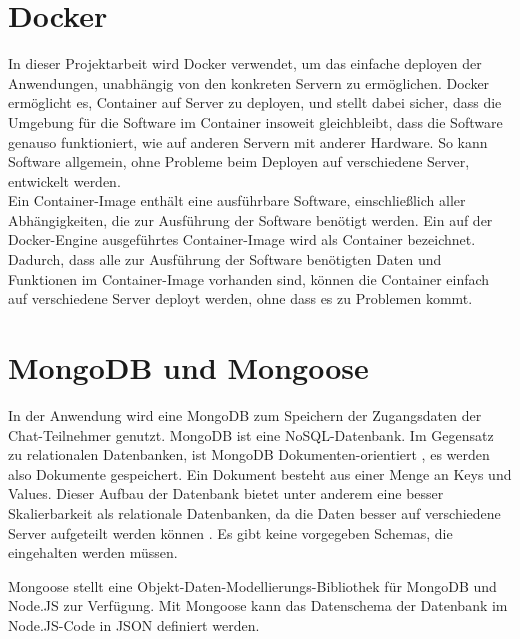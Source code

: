 \section{Docker}\label{sec:Docker}
In dieser Projektarbeit wird Docker verwendet, um das einfache deployen der Anwendungen, unabhängig von den konkreten Servern zu ermöglichen. Docker ermöglicht es, Container auf Server zu deployen, und stellt dabei sicher, dass die Umgebung für die Software im Container insoweit gleichbleibt, dass die Software genauso funktioniert, wie auf anderen Servern mit anderer Hardware. So kann Software allgemein, ohne Probleme beim Deployen auf verschiedene Server, entwickelt werden.\\ Ein Container-Image enthält eine ausführbare Software, einschließlich aller Abhängigkeiten, die zur Ausführung der Software benötigt werden. Ein auf der Docker-Engine ausgeführtes Container-Image wird als Container bezeichnet. Dadurch, dass alle zur Ausführung der Software benötigten Daten und Funktionen im Container-Image vorhanden sind, können die Container einfach auf verschiedene Server deployt werden, ohne dass es zu Problemen kommt. \cite[vgl.][]{Docker.2019}
\section{MongoDB und Mongoose}\label{sec:MongoDB}
In der Anwendung wird eine MongoDB zum Speichern der Zugangsdaten der Chat-Teilnehmer genutzt. MongoDB ist eine NoSQL-Datenbank. Im Gegensatz zu relationalen Datenbanken, ist MongoDB Dokumenten-orientiert \cite[vgl.][3]{Chadorow.2013}, es werden also Dokumente gespeichert. 
Ein Dokument besteht aus einer Menge an Keys und Values. Dieser Aufbau der Datenbank bietet unter anderem eine
besser Skalierbarkeit als relationale Datenbanken, da die Daten besser auf verschiedene Server aufgeteilt werden
können \cite[vgl.][4]{Chadorow.2013}. Es gibt keine vorgegeben Schemas, die eingehalten werden müssen.

Mongoose stellt eine Objekt-Daten-Modellierungs-Bibliothek für MongoDB und Node.JS zur Verfügung. Mit Mongoose kann das Datenschema der Datenbank im Node.JS-Code in JSON definiert werden. \cite[vgl.][10]{Holmes.2013}


